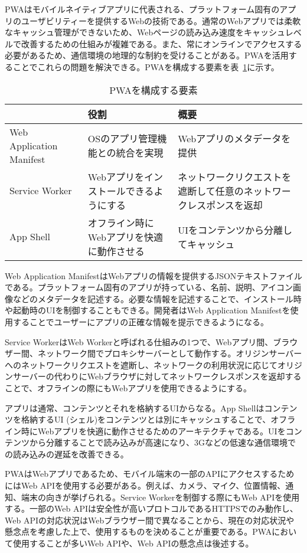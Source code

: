 PWAはモバイルネイティブアプリに代表される、プラットフォーム固有のアプリのユーザビリティーを提供するWebの技術である。通常のWebアプリでは柔軟なキャッシュ管理ができないため、Webページの読み込み速度をキャッシュレベルで改善するための仕組みが複雑である。また、常にオンラインでアクセスする必要があるため、通信環境の地理的な制約を受けることがある。PWAを活用することでこれらの問題を解決できる。PWAを構成する要素を表~\ref{table:PWAを構成する要素}に示す。
\begin{table}
    \centering
    \caption{PWAを構成する要素}
    \label{table:PWAを構成する要素}
    \begin{tabular}{|p{10em}|p{10em}|p{20em}|}
         \hline
         & 役割 & 概要 \\ \hline
         Web Application Manifest & OSのアプリ管理機能との統合を実現 & Webアプリのメタデータを提供 \\ \hline
         Service Worker & Webアプリをインストールできるようにする & ネットワークリクエストを遮断して任意のネットワークレスポンスを返却 \\ \hline
         App Shell & オフライン時にWebアプリを快適に動作させる & UIをコンテンツから分離してキャッシュ \\ \hline
    \end{tabular}
\end{table}

Web Application ManifestはWebアプリの情報を提供するJSONテキストファイルである。プラットフォーム固有のアプリが持っている、名前、説明、アイコン画像などのメタデータを記述する。必要な情報を記述することで、インストール時や起動時のUIを制御することもできる。開発者はWeb Application Manifestを使用することでユーザーにアプリの正確な情報を提示できるようになる。

Service WorkerはWeb Workerと呼ばれる仕組みの1つで、Webアプリ間、ブラウザー間、ネットワーク間でプロキシサーバーとして動作する。オリジンサーバーへのネットワークリクエストを遮断し、ネットワークの利用状況に応じてオリジンサーバーの代わりにWebブラウザに対してネットワークレスポンスを返却することで、オフラインの際にもWebアプリを使用できるようにする。

アプリは通常、コンテンツとそれを格納するUIからなる。App Shellはコンテンツを格納するUI (シェル)をコンテンツとは別にキャッシュすることで、オフライン時にWebアプリを快適に動作させるためのアーキテクチャである。UIをコンテンツから分離することで読み込みが高速になり、3Gなどの低速な通信環境での読み込みの遅延を改善できる。

PWAはWebアプリであるため、モバイル端末の一部のAPIにアクセスするためにはWeb APIを使用する必要がある。例えば、カメラ、マイク、位置情報、通知、端末の向きが挙げられる。Service Workerを制御する際にもWeb APIを使用する。一部のWeb APIは安全性が高いプロトコルであるHTTPSでのみ動作し、Web APIの対応状況はWebブラウザー間で異なることから、現在の対応状況や懸念点を考慮した上で、使用するものを決めることが重要である。PWAにおいて使用することが多いWeb APIや、Web APIの懸念点は後述する。

